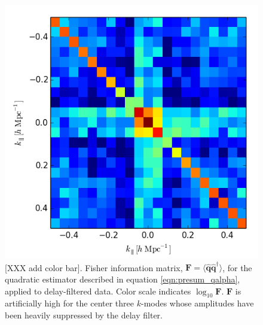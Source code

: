 \documentclass[twocolumn,numberedappendix]{emulateapj} \shorttitle{PSA64}
\newcommand{\qhat}{\hat{\mathbf{q}}}
\begin{document}
\begin{figure}[b!]\centering
\includegraphics[width=\columnwidth]{plots/fisher.png}
\caption{
[XXX add color bar].
Fisher information matrix, $\mathbf{F}=\langle\qhat\qhat^\dagger\rangle$, for the quadratic estimator described in
equation \ref{eqn:presum_qalpha}, applied to delay-filtered data. 
Color scale indicates $\log_{10}\mathbf{F}$.
$\mathbf{F}$ is artificially high for the center three $k$-modes whose amplitudes have been heavily
suppressed by the delay filter.
}


\label{fig:fisher}
\end{figure}
\end{document}
